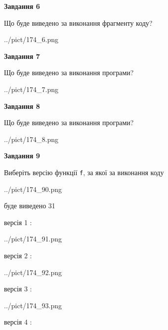 \documentclass[12pt, ukrainian]{article}
\def\code#1{\Verb!#1!}
\begin{document}
{\begin {large}
{\begin {center}\textbf{Завдання 6}\end {center}}

Що буде виведено за виконання фрагменту коду?\par
\begin{center}
	{../pict/174_6.png}
\end{center}
\newpage

{\begin {center}\textbf{Завдання 7}\end {center}}

Що буде виведено за виконання програми?\par
\begin{center}
	{../pict/174_7.png}
\end{center}
\newpage

{\begin {center}\textbf{Завдання 8}\end {center}}

Що буде виведено за виконання програми?\par
\begin{center}
	{../pict/174_8.png}
\end{center}
\newpage

{\begin {center}\textbf{Завдання 9}\end {center}}

Виберіть версію функції \code{f}, за якої за виконання коду
\begin{center}
	{../pict/174_90.png}
\end{center}
буде виведено 31

\vspace{5mm}
версія 1 :

\begin{center}
	{../pict/174_91.png}
\end{center}
версія 2 :

\begin{center}
	{../pict/174_92.png}
\end{center}
версія 3 :

\begin{center}
	{../pict/174_93.png}
\end{center}
версія 4 :


\end{large}}
\end{document}
